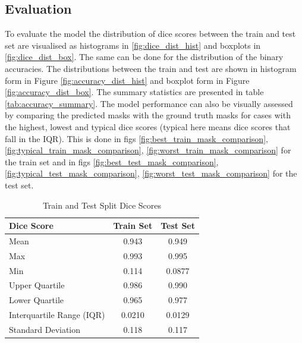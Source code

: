 \documentclass[11pt]{article}
\begin{document}
\subsection{Evaluation}
To evaluate the model the distribution of dice scores between the train and test set are visualised as histograms in \ref{fig:dice_dist_hist} and boxplots in \ref{fig:dice_dist_box}. The same can be done for the distribution of the binary accuracies. The distributions between the train and test are shown in histogram form in Figure \ref{fig:accuracy_dist_hist} and boxplot form in Figure \ref{fig:accuracy_dist_box}. The summary statistics are presented in table \ref{tab:accuracy_summary}.
The model performance can also be visually assessed by comparing the predicted masks with the ground truth masks for cases with the highest, lowest and typical dice scores (typical here means dice scores that fall in the IQR). This is done in figs \ref{fig:best_train_mask_comparison}, \ref{fig:typical_train_mask_comparison}, \ref{fig:worst_train_mask_comparison} for the train set and in figs \ref{fig:best_test_mask_comparison}, \ref{fig:typical_test_mask_comparison}, \ref{fig:worst_test_mask_comparison} for the test set.

\begin{table}[H]
    \centering
    \begin{tabular}{lcc}
    \hline
    \textbf{Dice Score}          & \textbf{Train Set} & \textbf{Test Set} \\ \hline
    Mean         & 0.943          & 0.949         \\
    Max           & 0.993           & 0.995          \\
    Min          & 0.114           & 0.0877          \\
    Upper Quartile           & 0.986           & 0.990          \\
    Lower Quartile           & 0.965           & 0.977          \\
    Interquartile Range (IQR) & 0.0210           & 0.0129          \\
    Standard Deviation       & 0.118           & 0.117          \\ \hline
    \end{tabular}
    \caption{Train and Test Split Dice Scores}

    \label{tab:dice_scores}
\end{table}
    
\end{document}
